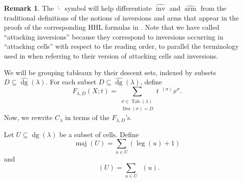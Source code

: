 \documentclass[11pt]{article}
\theoremstyle{definition}
\newtheorem{remark}[theo]{Remark}
\numberwithin{equation}{section}
\DeclareMathOperator{\PQT}{Tab}
\DeclareMathOperator{\dg}{dg}
\DeclareMathOperator{\arm}{arm}
\DeclareMathOperator{\leg}{leg}
\DeclareMathOperator{\maj}{maj}
\DeclareMathOperator{\inv}{inv}
\DeclareMathOperator{\Des}{Des}
\DeclareMathOperator{\invtwo}{\widehat{\inv}}
\DeclareMathOperator{\armtwo}{\widehat{\arm}}
\begin{document}
\begin{remark} 
The $\,\widehat{\cdot}\,$ symbol will help differentiate $\widehat{\inv}$ and $\widehat{\arm}$ from the traditional definitions of the notions of inversions and arms that appear in the proofs of the corresponding HHL formulas  in \cite[Section 3]{HHL05}. Note that we have called $\invtwo$ ``attacking inversions'' because they correspond to inversions occurring in ``attacking cells'' with respect to the reading order, to parallel the terminology used in \cite{HHL05} when referring to their version of attacking cells and inversions. 
\end{remark}

We will be grouping tableaux by their descent sets, indexed by subsets $D\subseteq \widehat{\dg}(\lambda)$. For each subset $D\subseteq \widehat{\dg}(\lambda)$, define
\begin{equation}\label{eq:F_D}
F_{\lambda,D}(X;t) = \sum_{\substack{\sigma\in\PQT(\lambda)\\ \Des(\sigma)=D}}  t^{\invtwo(\sigma)} x^{\sigma}.
\end{equation}
Now, we rewrite $C_{\lambda}$ in terms of the $F_{\lambda,D}$'s.

\begin{defn}
Let $U\subseteq \dg(\lambda)$ be a subset of cells. Define
\[
\maj(U) = \sum_{u\in U} (\leg(u)+1)
\]
and
\[
\armtwo(U)=\sum_{u\in U} \armtwo(u).
\]
\end{defn}
\end{document}
